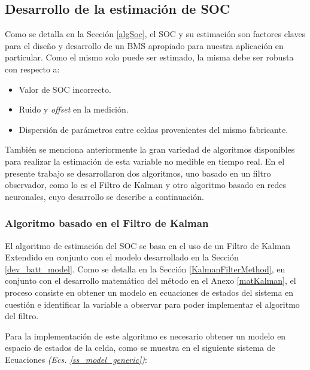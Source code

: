 \documentclass[10pt, a4paper]{article}
\newcounter{subsubsubsection}[subsubsection]
\begin{document}
\subsection{Desarrollo de la estimaci\'on de \acrshort{SOC}}\label{dev_soc_est}

Como se detalla en la Secci\'on \ref{algSoc}, el \acrshort{SOC} y su
estimaci\'on son factores claves para el diseño y desarrollo de un
\acrshort{BMS} apropiado para nuestra aplicaci\'on en particular. Como el mismo
solo puede ser estimado, la misma debe ser robusta con respecto a:

\begin{itemize}
    \item Valor de \acrshort{SOC} incorrecto.
    \item Ruido y \emph{offset} en la medici\'on.
    \item Dispersi\'on de par\'ametros entre celdas provenientes del mismo
        fabricante.
\end{itemize}

Tambi\'en se menciona anteriormente la gran variedad de algoritmos disponibles
para realizar la estimaci\'on de esta variable no medible en tiempo real. En el
presente trabajo se desarrollaron dos algoritmos, uno basado en un filtro
observador, como lo es el Filtro de Kalman y otro algoritmo basado en redes
neuronales, cuyo desarrollo se describe a continuaci\'on.

\subsubsection{Algoritmo basado en el Filtro de Kalman}

El algoritmo de estimaci\'on del \acrshort{SOC} se basa en el uso 
de un Filtro de Kalman Extendido en conjunto con el modelo desarrollado en la 
Secci\'on \ref{dev_batt_model}. Como se detalla en la Secci\'on
\ref{KalmanFilterMethod}, en conjunto con el desarrollo matem\'atico del
m\'etodo en el Anexo \ref{matKalman}, el proceso consiste en obtener un modelo
en ecuaciones de estados del sistema en cuesti\'on e identificar la variable a 
observar para poder implementar el algoritmo del filtro.


Para la implementaci\'on de este algoritmo es necesario obtener un modelo en
espacio de estados de la celda, como se muestra en el siguiente sistema de
Ecuaciones \emph{(Ecs. \ref{ss_model_generic})}:
\end{document}

